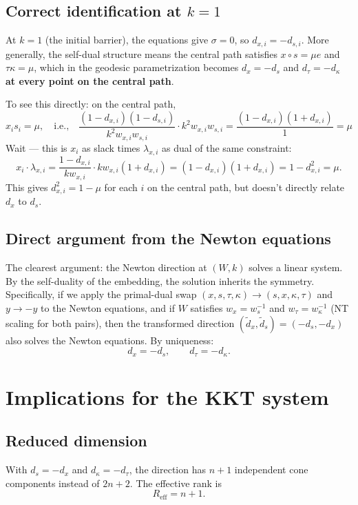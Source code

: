 \documentclass{article}
\begin{document}
\subsection{Correct identification at $k = 1$}

At $k = 1$ (the initial barrier), the equations give $\sigma = 0$, so $d_{x,i} = -d_{s,i}$. More generally, the self-dual structure means the central path satisfies $x \circ s = \mu e$ and $\tau \kappa = \mu$, which in the geodesic parametrization becomes $d_x = -d_s$ and $d_\tau = -d_\kappa$ \textbf{at every point on the central path}.

To see this directly: on the central path,
\[
  x_i s_i = \mu, \quad \text{i.e.,} \quad \frac{(1 - d_{x,i})(1 - d_{s,i})}{k^2 w_{x,i} w_{s,i}} \cdot k^2 w_{x,i} w_{s,i} = \frac{(1-d_{x,i})(1+d_{x,i})}{1} = \mu
\]
Wait --- this is $x_i$ as slack times $\lambda_{x,i}$ as dual of the same constraint:
\[
  x_i \cdot \lambda_{x,i} = \frac{1 - d_{x,i}}{k w_{x,i}} \cdot k w_{x,i}(1 + d_{x,i}) = (1 - d_{x,i})(1+d_{x,i}) = 1 - d_{x,i}^2 = \mu.
\]
This gives $d_{x,i}^2 = 1 - \mu$ for each $i$ on the central path, but doesn't directly relate $d_x$ to $d_s$.

\subsection{Direct argument from the Newton equations}

The clearest argument: the Newton direction at $(W, k)$ solves a linear system. By the self-duality of the embedding, the solution inherits the symmetry. Specifically, if we apply the primal-dual swap $(x, s, \tau, \kappa) \to (s, x, \kappa, \tau)$ and $y \to -y$ to the Newton equations, and if $W$ satisfies $w_x = w_s^{-1}$ and $w_\tau = w_\kappa^{-1}$ (NT scaling for both pairs), then the transformed direction $(\tilde{d}_x, \tilde{d}_s) = (-d_s, -d_x)$ also solves the Newton equations. By uniqueness:
\[
  \boxed{d_x = -d_s, \qquad d_\tau = -d_\kappa.}
\]

\section{Implications for the KKT system}

\subsection{Reduced dimension}

With $d_s = -d_x$ and $d_\kappa = -d_\tau$, the direction has $n + 1$ independent cone components instead of $2n + 2$. The effective rank is
\[
  R_{\text{eff}} = n + 1.
\]
\end{document}
